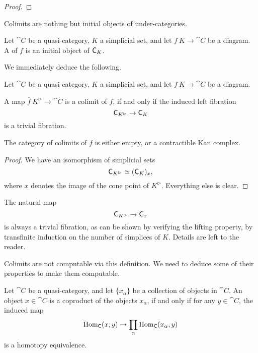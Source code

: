 \begin{proof}
    \nyw
\end{proof}

Colimits are nothing but initial objects of under-categories.

\begin{definition}
    Let $\cat C$ be a quasi-category,
    $K$ a simplicial set,
    and let $f\:K\to\cat C$ be a diagram.
    A  of $f$ is an initial object of $\mathsf{C}_{K\/}$.
\end{definition}

We immediately deduce the following.

\begin{corollary}
    Let $\cat C$ be a quasi-category,
    $K$ a simplicial set,
    and let $f\:K\to\cat C$ be a diagram.
    \begin{itms}
        \item A map $\bar f\:K^\vartriangleright\to\cat C$
        is a colimit of $f$, if and only if
        the induced left fibration
        \[ \mathsf{C}_{K^\vartriangleright\/}\to\mathsf{C}_{K\/} \]
        is a trivial fibration.
        \item The category of colimits of $f$ 
        is either empty, or a contractible Kan complex.
    \end{itms}
\end{corollary}

\begin{proof}
    We have an isomorphism of simplicial sets
    \[ \mathsf{C}_{K^\vartriangleright\/}\simeq(\mathsf{C}_{K\/})_{x\/}, \]
    where $x$ denotes the image of the cone point of $K^\vartriangleright$.
    Everything else is clear.
\end{proof}

\begin{remark}\label{thm-6-c}
    The natural map 
    \[ \mathsf{C}_{K^\vartriangleright\/}\to\mathsf{C}_{x\/} \]
    is always a trivial fibration,
    as can be shown by verifying the lifting property,
    by transfinite induction on the number of simplices of $K$.
    Details are left to the reader. \varqed
\end{remark}

Colimits are not computable via this definition.
We need to deduce some of their properties to make them computable.

\begin{proposition}
    Let $\cat C$ be a quasi-category,
    and let $\{x_\alpha\}$ be a collection of objects in $\cat C$.
    An object $x\in\cat C$ is a coproduct of the objects $x_\alpha$,
    if and only if for any $y\in\cat C$, the induced map 
    \[ \operatorname{Hom}_{\mathsf{C}}(x,y)\to\prod_\alpha\operatorname{Hom}_{\mathsf{C}}(x_\alpha,y) \]
    is a homotopy equivalence.
\end{proposition}

